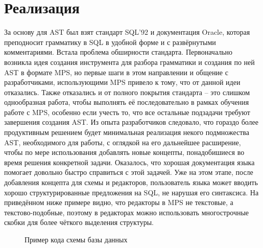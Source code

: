 \documentclass[12pt]{article}
\begin{document}
\section{Реализация}
За основу для AST был взят стандарт SQL'92 и документация Oracle, которая преподносит грамматику в SQL в удобной форме и с развёрнутыми комментариями. Встала проблема обширности стандарта. Первоначально возникла идея создания инструмента для разбора грамматики и создания по ней AST в формате MPS, но первые шаги в этом направлении и общение с разработчиками, использующими MPS привело к тому, что от данной идеи отказались. Также отказались и от полного покрытия стандарта -- это слишком однообразная работа, чтобы выполнять её последовательно в рамках обучения работе с MPS, особенно если учесть то, что все остальные подзадачи требуют завершения создания AST. Из опыта разработчиков следовало, что гораздо более продуктивным решением будет минимальная реализация некого подмножества AST, необходимого для работы, с оглядкой на его дальнейшее расширение, чтобы по мере использования добавлять новые концепты, понадобишиеся во время решения конкретной задачи. Оказалось, что хорошая документация языка помогает довольно быстро справиться с этой задачей. Уже на этом этапе, после добавления концепта для схемы и редакторов, пользователь языка может вводить хорошо структурированные предложения на SQL, не нарушая его синтаксиса. На приведённом ниже примере видно, что редакторы в MPS не текстовые, а текстово-подобные, поэтому в редакторах можно использовать многострочные скобки для более чёткого выделения структуры.\\

\begin{figure}[h]
\caption{Пример кода схемы базы данных}
\end{figure}
\end{document}
